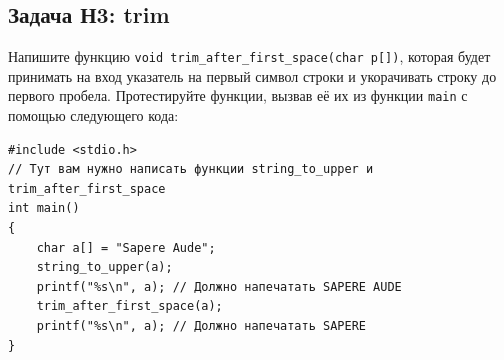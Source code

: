 \documentclass{article}
\begin{document}
\subsection*{Задача Н3: trim}
Напишите функцию \texttt{void trim\_after\_first\_space(char p[])}, которая будет принимать на вход указатель на первый символ строки и укорачивать строку до первого пробела. Протестируйте функции, вызвав её их из функции \texttt{main} с помощью следующего кода:
\begin{lstlisting}
#include <stdio.h>
// Тут вам нужно написать функции string_to_upper и trim_after_first_space
int main() 
{
    char a[] = "Sapere Aude";
    string_to_upper(a);
    printf("%s\n", a); // Должно напечатать SAPERE AUDE
    trim_after_first_space(a);
    printf("%s\n", a); // Должно напечатать SAPERE
}
\end{lstlisting}
\end{document}

